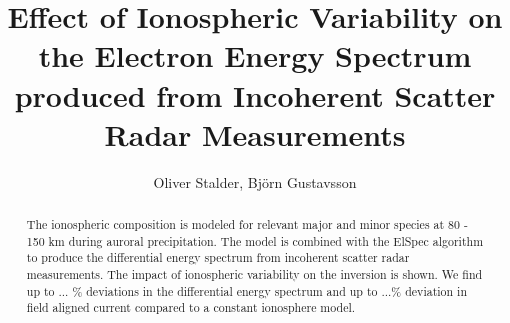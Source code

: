 \documentclass[10pt, a4paper]{article}
\numberwithin{equation}{section}										%
\begin{document}
%
\title{Effect of Ionospheric Variability on the Electron Energy Spectrum produced from Incoherent Scatter Radar Measurements}
\author{Oliver Stalder, Björn Gustavsson}
\maketitle

\begin{abstract}
The ionospheric composition is modeled for relevant major and minor species at 80 - 150 km during auroral precipitation. The model is combined with the ElSpec algorithm \cite{virtanen_electron_2018} to produce the differential energy spectrum from incoherent scatter radar measurements. The impact of ionospheric variability on the inversion is shown. We find up to ... \% deviations in the differential energy spectrum and up to ...\% deviation in field aligned current compared to a constant ionosphere model.
\end{abstract}





%
%	
%


\end{document}
